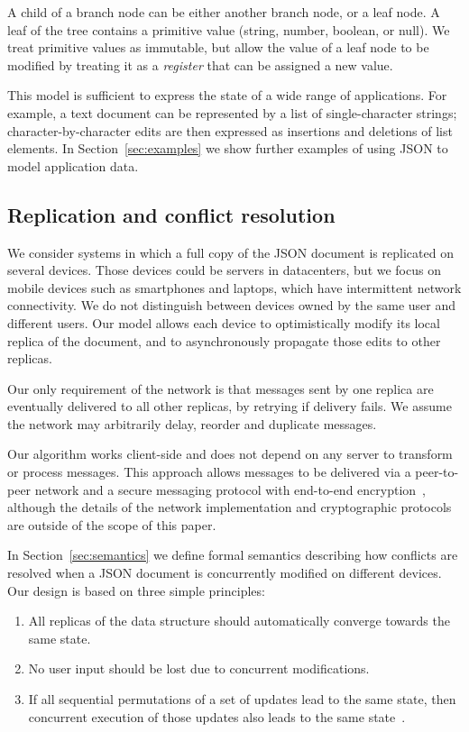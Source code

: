 \documentclass[10pt,journal,compsoc]{IEEEtran}
\begin{document}
A child of a branch node can be either another branch node, or a leaf node. A leaf of the tree contains a primitive value (string, number, boolean, or null). We treat primitive values as immutable, but allow the value of a leaf node to be modified by treating it as a \emph{register} that can be assigned a new value.

This model is sufficient to express the state of a wide range of applications. For example, a text document can be represented by a list of single-character strings; character-by-character edits are then expressed as insertions and deletions of list elements. In Section~\ref{sec:examples} we show further examples of using JSON to model application data.

\subsection{Replication and conflict resolution}\label{sec:intro-replication}

We consider systems in which a full copy of the JSON document is replicated on several devices. Those devices could be servers in datacenters, but we focus on mobile devices such as smartphones and laptops, which have intermittent network connectivity. We do not distinguish between devices owned by the same user and different users. Our model allows each device to optimistically modify its local replica of the document, and to asynchronously propagate those edits to other replicas.

Our only requirement of the network is that messages sent by one replica are eventually delivered to all other replicas, by retrying if delivery fails. We assume the network may arbitrarily delay, reorder and duplicate messages.

Our algorithm works client-side and does not depend on any server to transform or process messages. This approach allows messages to be delivered via a peer-to-peer network and a secure messaging protocol with end-to-end encryption~\cite{Unger:2015kg}, although the details of the network implementation and cryptographic protocols are outside of the scope of this paper.

In Section~\ref{sec:semantics} we define formal semantics describing how conflicts are resolved when a JSON document is concurrently modified on different devices. Our design is based on three simple principles:
\begin{enumerate}
\item All replicas of the data structure should automatically converge towards the same state.
\item No user input should be lost due to concurrent modifications.
\item If all sequential permutations of a set of updates lead to the same state, then concurrent execution of those updates also leads to the same state~\cite{Bieniusa:2012gt}.
\end{enumerate}
\end{document}
